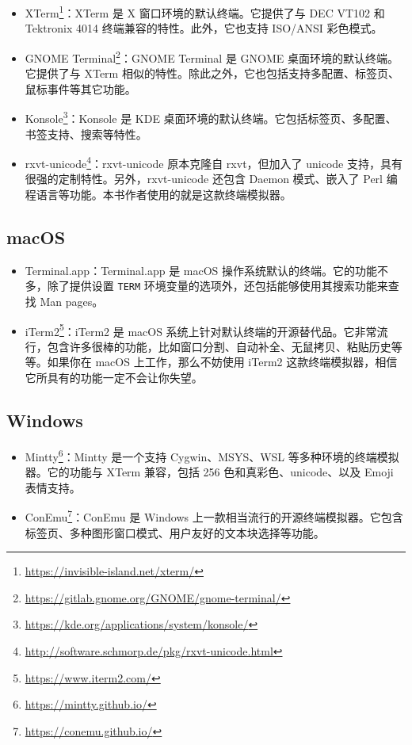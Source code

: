 \documentclass[]{ctexbook}
\providecommand{\tightlist}{%
  \setlength{\itemsep}{0pt}\setlength{\parskip}{0pt}}
\renewcommand{\href}[2]{#2\footnote{\url{#1}}}
\begin{document}
\begin{itemize}
\tightlist
\item
  \href{https://invisible-island.net/xterm/}{XTerm}：XTerm 是 X 窗口环境的默认终端。它提供了与 DEC VT102 和 Tektronix 4014 终端兼容的特性。此外，它也支持 ISO/ANSI 彩色模式。
\item
  \href{https://gitlab.gnome.org/GNOME/gnome-terminal/}{GNOME Terminal}：GNOME Terminal 是 GNOME 桌面环境的默认终端。它提供了与 XTerm 相似的特性。除此之外，它也包括支持多配置、标签页、鼠标事件等其它功能。
\item
  \href{https://kde.org/applications/system/konsole/}{Konsole}：Konsole 是 KDE 桌面环境的默认终端。它包括标签页、多配置、书签支持、搜索等特性。
\item
  \href{http://software.schmorp.de/pkg/rxvt-unicode.html}{rxvt-unicode}：rxvt-unicode 原本克隆自 rxvt，但加入了 unicode 支持，具有很强的定制特性。另外，rxvt-unicode 还包含 Daemon 模式、嵌入了 Perl 编程语言等功能。本书作者使用的就是这款终端模拟器。
\end{itemize}

\hypertarget{macos}{%
\subsection{macOS}\label{macos}}

\begin{itemize}
\tightlist
\item
  Terminal.app：Terminal.app 是 macOS 操作系统默认的终端。它的功能不多，除了提供设置 \texttt{TERM} 环境变量的选项外，还包括能够使用其搜索功能来查找 Man pages。
\item
  \href{https://www.iterm2.com/}{iTerm2}：iTerm2 是 macOS 系统上针对默认终端的开源替代品。它非常流行，包含许多很棒的功能，比如窗口分割、自动补全、无鼠拷贝、粘贴历史等等。如果你在 macOS 上工作，那么不妨使用 iTerm2 这款终端模拟器，相信它所具有的功能一定不会让你失望。
\end{itemize}

\hypertarget{windows}{%
\subsection{Windows}\label{windows}}

\begin{itemize}
\tightlist
\item
  \href{https://mintty.github.io/}{Mintty}：Mintty 是一个支持 Cygwin、MSYS、WSL 等多种环境的终端模拟器。它的功能与 XTerm 兼容，包括 256 色和真彩色、unicode、以及 Emoji 表情支持。
\item
  \href{https://conemu.github.io/}{ConEmu}：ConEmu 是 Windows 上一款相当流行的开源终端模拟器。它包含标签页、多种图形窗口模式、用户友好的文本块选择等功能。
\end{itemize}
\end{document}
